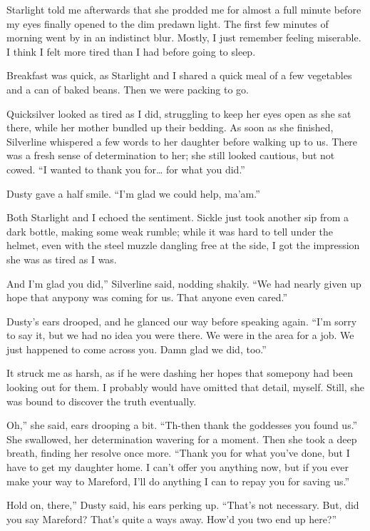 Starlight told me afterwards that she prodded me for almost a full minute before my eyes finally opened to the dim predawn light. The first few minutes of morning went by in an indistinct blur. Mostly, I just remember feeling miserable. I think I felt more tired than I had before going to sleep.

Breakfast was quick, as Starlight and I shared a quick meal of a few vegetables and a can of baked beans. Then we were packing to go.

Quicksilver looked as tired as I did, struggling to keep her eyes open as she sat there, while her mother bundled up their bedding. As soon as she finished, Silverline whispered a few words to her daughter before walking up to us. There was a fresh sense of determination to her; she still looked cautious, but not cowed. “I wanted to thank you for… for what you did.”

Dusty gave a half smile. “I’m glad we could help, ma’am.”

Both Starlight and I echoed the sentiment. Sickle just took another sip from a dark bottle, making some weak rumble; while it was hard to tell under the helmet, even with the steel muzzle dangling free at the side, I got the impression she was as tired as I was.

\leavevmode{}And I’m glad you did,” Silverline said, nodding shakily. “We had nearly given up hope that anypony was coming for us. That anyone even cared.”

Dusty’s ears drooped, and he glanced our way before speaking again. “I’m sorry to say it, but we had no idea you were there. We were in the area for a job. We just happened to come across you. Damn glad we did, too.”

It struck me as harsh, as if he were dashing her hopes that somepony had been looking out for them. I probably would have omitted that detail, myself. Still, she was bound to discover the truth eventually.

\leavevmode{}Oh,” she said, ears drooping a bit. “Th-then thank the goddesses you found us.” She swallowed, her determination wavering for a moment. Then she took a deep breath, finding her resolve once more. “Thank you for what you’ve done, but I have to get my daughter home. I can’t offer you anything now, but if you ever make your way to Mareford, I’ll do anything I can to repay you for saving us.”

\leavevmode{}Hold on, there,” Dusty said, his ears perking up. “That’s not necessary. But, did you say Mareford? That’s quite a ways away. How’d you two end up here?”

